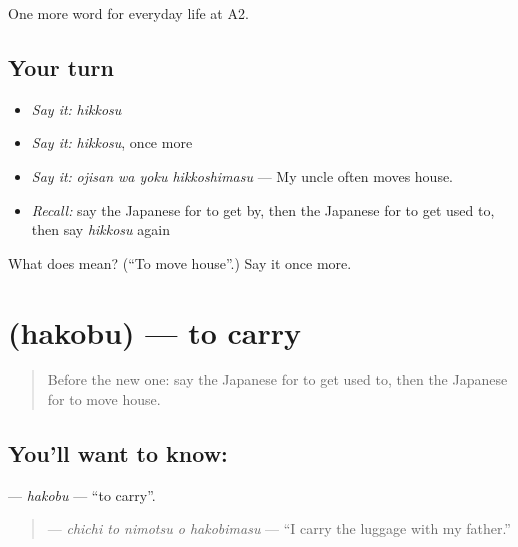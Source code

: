 \begin{grammarlens}[title={What you've built}]
One more word for everyday life at A2.
\end{grammarlens}

\subsection*{Your turn}
\begin{itemize}
\raggedright
  \item \emph{Say it:} \emph{hikkosu}
  \item \emph{Say it:} \emph{hikkosu}, once more
  \item \emph{Say it:} \emph{ojisan wa yoku hikkoshimasu} — My uncle often moves house.
  \item \emph{Recall:} say the Japanese for to get by, then the Japanese for to get used to, then say \emph{hikkosu} again
\end{itemize}

\begin{tcolorbox}[breakable,colback=teal!4,colframe=teal!35!black,title={Before you move on}]
What does  mean? (\textquotedblleft{}To move house\textquotedblright{}.) Say it once more.
\end{tcolorbox}
\section[\texorpdfstring{\ja{はこぶ} (hakobu)}{はこぶ (hakobu)}]{ (hakobu) — to carry}

\label{lesson:JA-C155-hakobu}



\begin{quote}
Before the new one: say the Japanese for to get used to, then the Japanese for to move house.
\end{quote}

\subsection*{You'll want to know: }
\textbf{} — \emph{hakobu} — \textquotedblleft{}to carry\textquotedblright{}.

\begin{quote}
\textbf{  } — \emph{chichi to nimotsu o hakobimasu} — \textquotedblleft{}I carry the luggage with my father.\textquotedblright{}
\end{quote}

